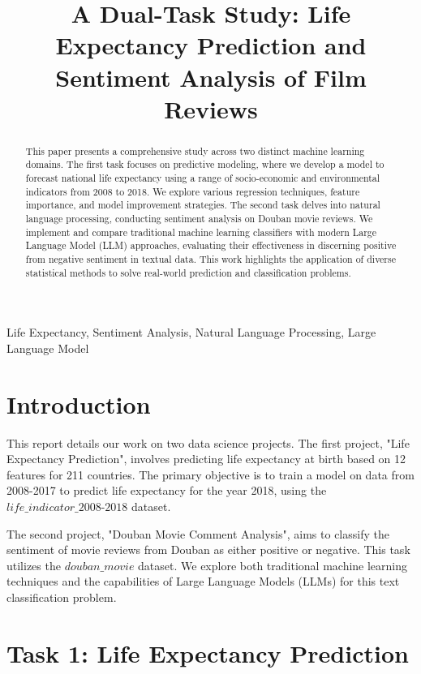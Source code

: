 \documentclass{article}
\title{A Dual-Task Study: Life Expectancy Prediction and Sentiment Analysis of Film Reviews}
\begin{document}
%
\maketitle
%
\begin{abstract}
This paper presents a comprehensive study across two distinct machine learning domains. The first task 
focuses on predictive modeling, where we develop a model to forecast national life expectancy using a
range of socio-economic and environmental indicators from 2008 to 2018. We explore various regression 
techniques, feature importance, and model improvement strategies. The second task delves into natural 
language processing, conducting sentiment analysis on Douban movie reviews. We implement and compare 
traditional machine learning classifiers with modern Large Language Model (LLM) approaches, evaluating 
their effectiveness in discerning positive from negative sentiment in textual data. This work highlights the 
application of diverse statistical methods to solve real-world prediction and classification problems.
\end{abstract}
%
\begin{keywords}
Life Expectancy, Sentiment Analysis, Natural Language Processing, Large Language Model
\end{keywords}
%
\section{Introduction}
\label{sec:intro}

This report details our work on two data science projects. 
The first project, "Life Expectancy Prediction", involves predicting life expectancy at birth based on 12 features for 211 countries. 
The primary objective is to train a model on data from 2008-2017 to predict life expectancy for the year 2018, 
using the $\textit{life\_indicator\_2008-2018}$ dataset.

The second project, "Douban Movie Comment Analysis", aims to classify the sentiment of movie reviews from 
Douban as either positive or negative. This task utilizes the $\textit{douban\_movie}$ dataset. We explore both traditional machine learning techniques and the capabilities of Large Language Models (LLMs) for this text classification problem.

\section{Task 1: Life Expectancy Prediction}
\label{sec:task1}
\end{document}
